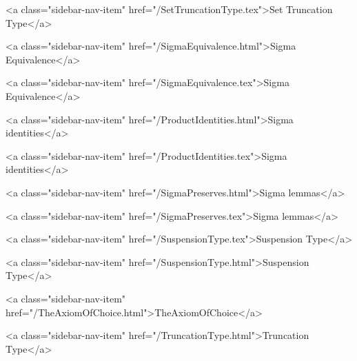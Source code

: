       
    
      
        
          <a class="sidebar-nav-item" href="/SetTruncationType.tex">Set Truncation Type</a>
        
      
    
      
        
          <a class="sidebar-nav-item" href="/SigmaEquivalence.html">Sigma Equivalence</a>
        
      
    
      
        
          <a class="sidebar-nav-item" href="/SigmaEquivalence.tex">Sigma Equivalence</a>
        
      
    
      
        
          <a class="sidebar-nav-item" href="/ProductIdentities.html">Sigma identities</a>
        
      
    
      
        
          <a class="sidebar-nav-item" href="/ProductIdentities.tex">Sigma identities</a>
        
      
    
      
        
          <a class="sidebar-nav-item" href="/SigmaPreserves.html">Sigma lemmas</a>
        
      
    
      
        
          <a class="sidebar-nav-item" href="/SigmaPreserves.tex">Sigma lemmas</a>
        
      
    
      
        
          <a class="sidebar-nav-item" href="/SuspensionType.tex">Suspension Type</a>
        
      
    
      
        
          <a class="sidebar-nav-item" href="/SuspensionType.html">Suspension Type</a>
        
      
    
      
        
          <a class="sidebar-nav-item" href="/TheAxiomOfChoice.html">TheAxiomOfChoice</a>
        
      
    
      
        
          <a class="sidebar-nav-item" href="/TruncationType.html">Truncation Type</a>
        
